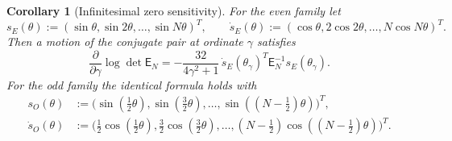 \documentclass[11pt]{amsart}
\numberwithin{equation}{section}
\theoremstyle{plain}
\newtheorem{corollary}[theorem]{Corollary}
\theoremstyle{definition}
\theoremstyle{remark}
\newcommand{\E}{\mathsf E}
\begin{document}
\begin{corollary}[Infinitesimal zero sensitivity]
\label{cor:infinitesimal_zero_sensitivity}
For the even family let
\begin{equation}
s_E(\theta):=(\sin\theta,\sin2\theta,\ldots,\sin N\theta)^T,
\qquad
\dot s_E(\theta):=(\cos\theta,2\cos2\theta,\ldots,N\cos N\theta)^T.
\end{equation}
Then a motion of the conjugate pair at ordinate $\gamma$ satisfies
\begin{equation}
\boxed{
\frac{\partial}{\partial\gamma}\log\det\E_N
=-\frac{32}{4\gamma^2+1}\,
\dot s_E(\theta_\gamma)^T\E_N^{-1}s_E(\theta_\gamma).}
\label{eq:E_zero_logdet_derivative}
\end{equation}
For the odd family the identical formula holds with
\begin{align}
s_O(\theta)&:=\bigl(\sin(\tfrac12\theta),\sin(\tfrac32\theta),\ldots,
\sin((N-\tfrac12)\theta)\bigr)^T,\\
\dot s_O(\theta)&:=\bigl(\tfrac12\cos(\tfrac12\theta),\tfrac32\cos(\tfrac32\theta),\ldots,
(N-\tfrac12)\cos((N-\tfrac12)\theta)\bigr)^T.
\end{align}
\end{corollary}
\end{document}
